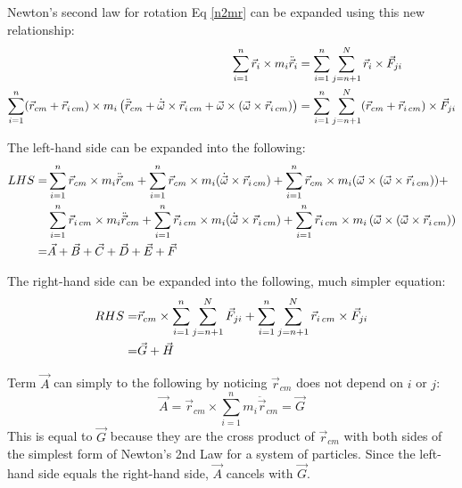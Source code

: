 \documentclass[10pt]{article}
\begin{document}
Newton's second law for rotation Eq \ref{n2mr} can be expanded using this new
relationship:
\begin{align}
    \sum_{i=1}^n\vec{r}_i\times m_i\ddot{\vec{r}}_i &= 
        \sum_{i=1}^n\sum_{j=n+1}^N \vec{r}_i\times\vec{F}_{ji} \notag \\
    \sum_{i=1}^n(\vec{r}_{cm}+\vec{r}_{i\,cm})
        \times m_i\left(
        \ddot{\vec{r}}_{cm} + \dot{\vec{\omega}}\times\vec{r}_{i\,cm} + 
        \vec{\omega}\times(\vec{\omega}\times\vec{r}_{i\,cm})\right) &= 
        \sum_{i=1}^n\sum_{j=n+1}^N (\vec{r}_{cm}+\vec{r}_{i\,cm})
        \times\vec{F}_{ji}
\end{align}

The left-hand side can be expanded into the following:
\begin{align}
    LHS = 
    &\sum_{i=1}^n\vec{r}_{cm}\times m_i \ddot{\vec{r}}_{cm}  +
    \sum_{i=1}^n\vec{r}_{cm}\times m_i
        (\dot{\vec{\omega}}\times\vec{r}_{i\,cm}) +
    \sum_{i=1}^n\vec{r}_{cm}\times m_i 
        (\vec{\omega}\times(\vec{\omega}\times\vec{r}_{i\,cm})) + \notag \\
    &\sum_{i=1}^n\vec{r}_{i\,cm}\times m_i\ddot{\vec{r}}_{cm} +
    \sum_{i=1}^n\vec{r}_{i\,cm}\times m_i 
        (\dot{\vec{\omega}}\times\vec{r}_{i\,cm}) +
    \sum_{i=1}^n\vec{r}_{i\,cm}\times m_i 
        \left(\vec{\omega}\times(\vec{\omega}\times\vec{r}_{i\,cm})\right) 
        \notag \\
    =&\vec{A} + \vec{B} + \vec{C} + \vec{D} + \vec{E} + \vec{F}
\end{align}

The right-hand side can be expanded into the following, much simpler 
equation:
\begin{align}
    RHS = &
        \vec{r}_{cm}\times\sum_{i=1}^n\sum_{j=n+1}^N\vec{F}_{ji} +
        \sum_{i=1}^n\sum_{j=n+1}^N \vec{r}_{i\,cm}\times\vec{F}_{ji} \notag \\
    =& \vec{G} + \vec{H}
\end{align}

Term $\vec{A}$ can simply to the following by noticing $\vec{r}_{cm}$ does 
not depend on $i$ or $j$:
\begin{equation*}
    \vec{A} = \vec{r}_{cm}\times \sum_{i=1}^n m_i \ddot{\vec{r}}_{cm} = \vec{G}
\end{equation*}
This is equal to $\vec{G}$ because they are the cross product of 
$\vec{r}_{cm}$ with both sides of the simplest form of Newton's 2nd Law 
for a system of particles. Since the left-hand side equals the right-hand 
side, $\vec{A}$ cancels with $\vec{G}$.
\end{document}
